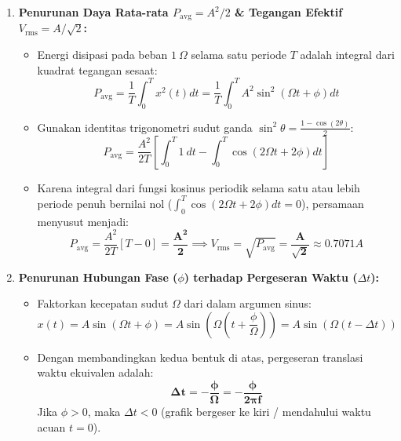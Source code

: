 \documentclass[11pt,a4paper]{article}
\begin{document}
\begin{penurunanbox}
\begin{enumerate}[leftmargin=*]
  \item \textbf{Penurunan Daya Rata-rata $P_{\text{avg}} = A^2/2$ \& Tegangan Efektif $V_{\text{rms}} = A/\sqrt{2}$:}
  \begin{itemize}
    \item Energi disipasi pada beban $1\ \Omega$ selama satu periode $T$ adalah integral dari kuadrat tegangan sesaat:
    \[
    P_{\text{avg}} = \frac{1}{T}\int_0^T x^2(t) dt = \frac{1}{T}\int_0^T A^2 \sin^2(\Omega t + \phi) dt
    \]
    \item Gunakan identitas trigonometri sudut ganda $\sin^2\theta = \frac{1 - \cos(2\theta)}{2}$:
    \[
    P_{\text{avg}} = \frac{A^2}{2T} \left[ \int_0^T 1\ dt - \int_0^T \cos(2\Omega t + 2\phi) dt \right]
    \]
    \item Karena integral dari fungsi kosinus periodik selama satu atau lebih periode penuh bernilai nol ($\int_0^T \cos(2\Omega t + 2\phi) dt = 0$), persamaan menyusut menjadi:
    \begin{equation}
    P_{\text{avg}} = \frac{A^2}{2T} [T - 0] = \mathbf{\frac{A^2}{2}} \implies V_{\text{rms}} = \sqrt{P_{\text{avg}}} = \mathbf{\frac{A}{\sqrt{2}}} \approx 0.7071 A
    \end{equation}
  \end{itemize}

  \item \textbf{Penurunan Hubungan Fase ($\phi$) terhadap Pergeseran Waktu ($\Delta t$):}
  \begin{itemize}
    \item Faktorkan kecepatan sudut $\Omega$ dari dalam argumen sinus:
    \[
    x(t) = A \sin(\Omega t + \phi) = A \sin\left( \Omega \left( t + \frac{\phi}{\Omega} \right) \right) = A \sin(\Omega(t - \Delta t))
    \]
    \item Dengan membandingkan kedua bentuk di atas, pergeseran translasi waktu ekuivalen adalah:
    \begin{equation}
    \mathbf{\Delta t = -\frac{\phi}{\Omega} = -\frac{\phi}{2\pi f}}
    \end{equation}
    Jika $\phi > 0$, maka $\Delta t < 0$ (grafik bergeser ke kiri / mendahului waktu acuan $t=0$).
  \end{itemize}
\end{enumerate}
\end{penurunanbox}
\end{document}
